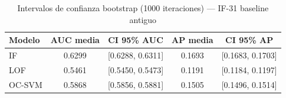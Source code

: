 \begin{table}[htbp]
\centering
\small
\caption{Intervalos de confianza bootstrap (1000 iteraciones) — IF-31 baseline antiguo}
\label{tab:bootstrap-ci-if31-baseline}
\begin{tabular}{lcccc}
\toprule
Modelo & AUC media & CI 95\% AUC & AP media & CI 95\% AP \\
\midrule
  IF & 0.6299 & [0.6288, 0.6311] & 0.1693 & [0.1683, 0.1703] \\
  LOF & 0.5461 & [0.5450, 0.5473] & 0.1191 & [0.1184, 0.1197] \\
  OC-SVM & 0.5868 & [0.5856, 0.5881] & 0.1505 & [0.1496, 0.1514] \\
\bottomrule
\end{tabular}
\end{table}
